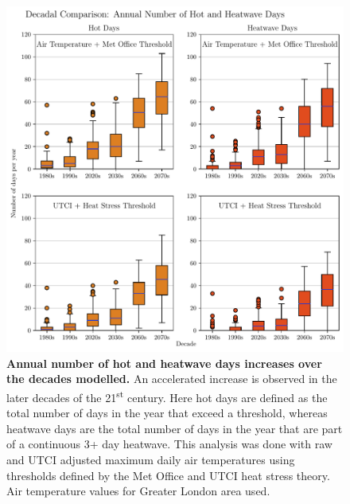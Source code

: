 \documentclass[10pt,letterpaper]{article}
\begin{document}
\begin{figure}[!h]
\begin{adjustwidth}{-2.25in}{0in}
    \begin{center}
        \includegraphics[width=0.87\linewidth]{./boxplots_slides.pdf}
    \end{center}
    \caption{
    {\bf Annual number of hot and heatwave days increases over the decades modelled.}
    An accelerated increase is observed in the later decades of the 21\textsuperscript{st} century.
    Here hot days are defined as the total number of days in the year that exceed a threshold, whereas heatwave days are the total number of days in the year that are part of a continuous 3+ day heatwave. This analysis was done with raw and UTCI adjusted maximum daily air temperatures using thresholds defined by the Met Office and UTCI heat stress theory. Air temperature values for Greater London area used.
    }
    \label{boxplots}
\end{adjustwidth}
\end{figure}
\end{document}
